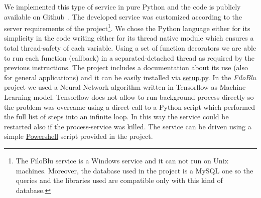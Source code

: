 \documentclass{standalone}
\begin{document}
We implemented this type of service in pure \textsf{Python} and the code is publicly available on Github~\cite{FiloBlu}.
The developed service was customized according to the server requirements of the project\footnote{
  The FiloBlu service is a Windows service and it can not run on Unix machines.
  Moreover, the database used in the project is a \textsf{MySQL} one so the queries and the libraries used are compatible only with this kind of database.
}.
We chose the \textsf{Python} language either for its simplicity in the code writing either for its thread native module which ensures a total thread-safety of each variable.
Using a set of function decorators we are able to run each function (\textsf{callback}) in a separated-detached thread as required by the previous instructions.
The project includes a documentation about its use (also for general applications) and it can be easily installed via \href{https://github.com/Nico-Curti/FiloBluService/blob/master/setup.py}{\textsf{setup.py}}.
In the \emph{FiloBlu} project we used a Neural Network algorithm written in \textsf{Tensorflow} as Machine Learning model.
\textsf{Tensorflow} does not allow to run background process directly so the problem was overcame using a direct call to a \textsf{Python} script which performed the full list of steps into an infinite loop.
In this way the service could be restarted also if the process-service was killed.
The service can be driven using a simple \href{https://github.com/Nico-Curti/FiloBluService/blob/master/filobluservice.ps1}{\textsf{Powershell}} script provided in the project.
\end{document}
